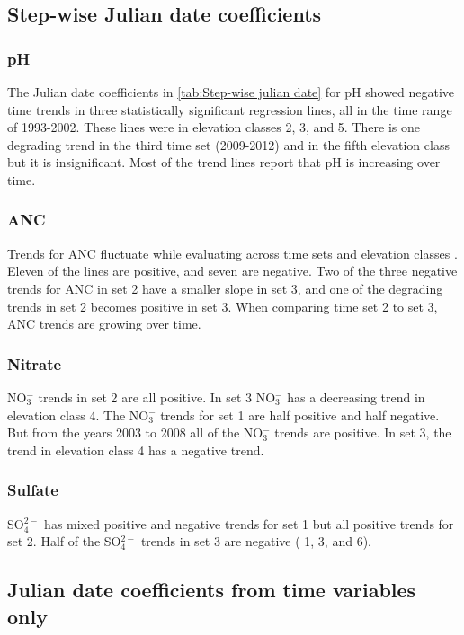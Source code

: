 \subsection{Step-wise Julian date coefficients}

\subsubsection{pH}

The Julian date coefficients in \autoref{tab:Step-wise julian date} for pH showed negative time trends in three statistically significant regression lines, all in the time range of 1993-2002.  
These lines were in elevation classes 2, 3, and 5.  
There is one degrading trend in the third time set (2009-2012) and in the fifth elevation class but it is insignificant.   
Most of the trend lines report that pH is increasing over time.

\subsubsection{ANC}

Trends for ANC fluctuate while evaluating across time sets and elevation classes .  
Eleven of the lines are positive, and seven are negative.   
Two of the three negative trends for ANC in set 2 have a smaller slope in set 3, and one of the degrading trends in set 2 becomes positive in set 3. 
When comparing time set 2 to set 3, ANC trends are growing over time. 

\subsubsection{Nitrate}

NO$_3^-$ trends in set 2 are all positive. In set 3 NO$_3^-$ has a decreasing trend  in elevation class 4. 
The NO$_3^-$ trends for set 1 are half positive and half negative. But from the years 2003 to 2008 all of the NO$_3^-$ trends are positive. 
In set 3, the trend in elevation class 4 has a negative trend.

\subsubsection{Sulfate}

SO$_4^{2-}$ has mixed positive and negative trends for set 1 but all positive trends for set 2. Half of the SO$_4^{2-}$ trends in set 3 are negative ( 1, 3, and 6).

\subsection{Julian date coefficients from time variables only}

